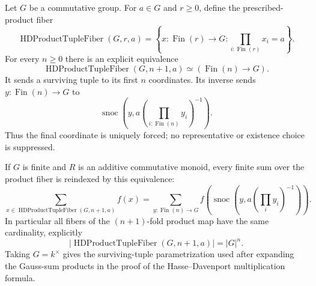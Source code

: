 \begin{theorem}\label{mod:finitefield-hdproductparametrization}
Let $G$ be a commutative group.  For $a\in G$ and $r\geq0$, define the
prescribed-product fiber
\[
 \operatorname{HDProductTupleFiber}(G,r,a)
 =\left\{x:\operatorname{Fin}(r)\longrightarrow G:
          \prod_{i:\operatorname{Fin}(r)}x_i=a\right\}.
\]
For every $n\geq0$ there is an explicit equivalence
\[
 \operatorname{HDProductTupleFiber}(G,n+1,a)
 \simeq (\operatorname{Fin}(n)\longrightarrow G).
\]
It sends a surviving tuple to its first $n$ coordinates.  Its inverse sends
$y:\operatorname{Fin}(n)\to G$ to
\[
 \operatorname{snoc}\!\left(y,
       a\left(\prod_{i:\operatorname{Fin}(n)}y_i\right)^{-1}\right).
\]
Thus the final coordinate is uniquely forced; no representative or
existence choice is suppressed.

If $G$ is finite and $R$ is an additive commutative monoid, every finite sum
over the product fiber is reindexed by this equivalence:
\[
 \sum_{x\in\operatorname{HDProductTupleFiber}(G,n+1,a)}f(x)
 =\sum_{y:\operatorname{Fin}(n)\to G}
   f\!\left(\operatorname{snoc}\!\left(y,
       a\left(\prod_i y_i\right)^{-1}\right)\right).
\]
In particular all fibers of the $(n+1)$-fold product map have the same
cardinality, explicitly
\[
 \left|\operatorname{HDProductTupleFiber}(G,n+1,a)\right|=|G|^n.
\]
Taking $G=k^\times$ gives the surviving-tuple parametrization used after
expanding the Gauss-sum products in the proof of the Hasse--Davenport
multiplication formula.
\leanok
{}
\FormalizationContract
\end{theorem}
